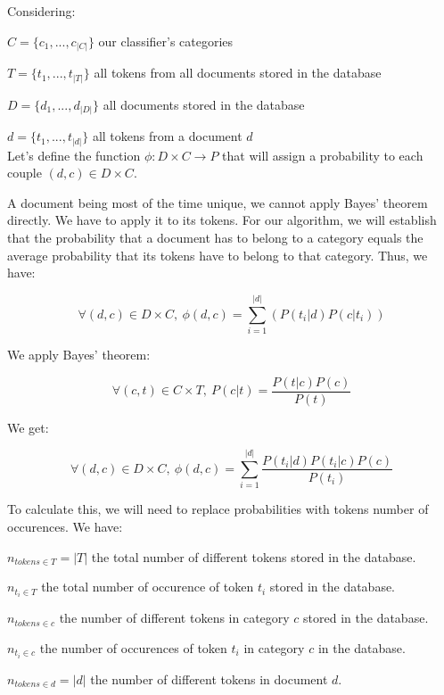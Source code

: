 \documentclass[a4paper,11pt]{article}
\begin{document}
Considering:

$C = \{c_1, ..., c_{|C|}\}$ our classifier's categories

$T = \{t_1, ..., t_{|T|}\}$ all tokens from all documents stored in the database

$D = \{d_1, ..., d_{|D|}\}$ all documents stored in the database

$d = \{t_1, ..., t_{|d|}\}$ all tokens from a document $d$
~\\

Let's define the function $\phi : D \times C \rightarrow P$ that will assign
a probability to each couple
$(d, c) \in D \times C$.

A document being most of the time unique, we cannot apply Bayes' theorem
directly. We have to apply it to its tokens. For our algorithm, we will
establish that the probability that a document has to belong to a category
equals the average probability that its tokens have to belong to that
category. Thus, we have:

\begin{equation}
    \forall (d, c) \in D \times C,\ 
    \phi(d, c)
    = \sum_{i=1}^{|d|} (P(t_i | d) P(c | t_i))
\end{equation}

We apply Bayes' theorem:

\begin{equation}
    \forall (c, t) \in C \times T,\ 
    P(c| t)
    = \frac{P(t | c) P(c)}{P(t)}
\end{equation}

We get:

\begin{equation}\label{eq:final_prob}
    \forall (d, c) \in D \times C,\ 
    \phi(d, c)
    = \sum_{i=1}^{|d|} \frac{P(t_i | d) P(t_i | c) P(c)}{P(t_i)}
\end{equation}

To calculate this, we will need to replace probabilities with tokens number of
occurences. We have:

$n_{tokens \in T} = |T|$ the total number of different tokens stored in the
database.

$n_{t_i \in T}$ the total number of occurence of token $t_i$ stored in the
database.

$n_{tokens \in c}$ the number of different tokens in category $c$ stored
in the database.

$n_{t_i \in c}$ the number of occurences of token $t_i$ in category $c$
in the database.

$n_{tokens \in d} = |d|$ the number of different tokens in document $d$.
\end{document}
